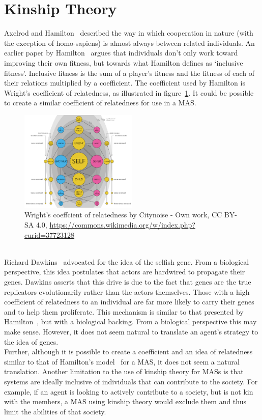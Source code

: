 \documentclass[]{final_report}
\begin{document}
\section{Kinship Theory}
\label{sec:kin}
Axelrod and Hamilton~\cite{evolution_of_cooperation} described the way in which cooperation in nature (with the exception of homo-sapiens) is almost always between related individuals. An earlier paper by Hamilton~\cite{kinhamilton} argues that individuals don't only work toward improving their own fitness, but towards what Hamilton defines as `inclusive fitness'. Inclusive fitness is the sum of a player's fitness and the fitness of each of their relations multiplied by a coefficient. The coefficient used by Hamilton is Wright's coefficient of relatedness, as illustrated in figure~\ref{fig:coefrelate}. It could be possible to create a similar coefficient of relatedness for use in a MAS.
\begin{figure}
	\center
	\includegraphics[width=0.5\textwidth]{coefrelate.png}
	\caption{Wright's coeffcient of relatedness by Citynoise - Own work, CC BY-SA 4.0, \url{https://commons.wikimedia.org/w/index.php?curid=37723128}}
	\label{fig:coefrelate}
\end{figure}
\\Richard Dawkins~\cite{selfish_gene} advocated for the idea of the selfish gene. From a biological perspective, this idea postulates that actors are hardwired to propagate their genes. Dawkins asserts that this drive is due to the fact that genes are the true replicators evolutionarily rather than the actors themselves. Those with a high coefficient of relatedness to an individual are far more likely to carry their genes and to help them proliferate. This mechanism is similar to that presented by Hamilton~\cite{kinhamilton}, but with a biological backing. From a biological perspective this may make sense. However, it does not seem natural to translate an agent's strategy to the idea of genes.\\
Further, although it is possible to create a coefficient and an idea of relatedness similar to that of Hamilton's model~\cite{kinhamilton} for a MAS, it does not seem a natural translation. Another limitation to the use of kinship theory for MASs is that systems are ideally inclusive of individuals that can contribute to the society. For example, if an agent is looking to actively contribute to a society, but is not kin with the members, a MAS using kinship theory would exclude them and thus limit the abilities of that society.\\
\end{document}
